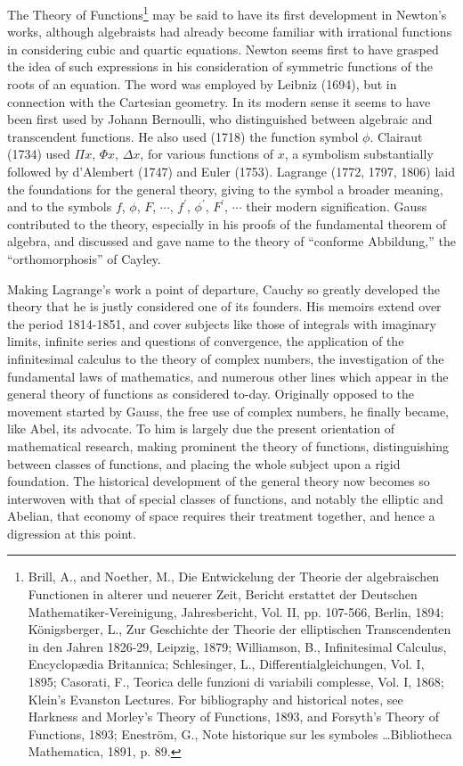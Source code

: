 \documentclass[oneside]{book}
\begin{document}
{The Theory of Functions\footnote{Brill, A., and Noether, M., Die
Entwickelung der Theorie der algebraischen Functionen in alterer
und neuerer Zeit, Bericht erstattet der Deutschen
Mathematiker-Vereinigung, Jahresbericht, Vol. II, pp. 107-566,
Berlin, 1894; K\"onigsberger, L., Zur Geschichte der Theorie der
elliptischen Transcendenten in den Jahren 1826-29, Leipzig, 1879;
Williamson, B., Infinitesimal Calculus, Encyclop\ae{}dia Britannica;
Schlesinger, L., Differentialgleichungen, Vol. I, 1895; Casorati,
F., Teorica delle funzioni di variabili complesse, Vol. I, 1868;
Klein's Evanston Lectures. For bibliography and historical notes,
see Harkness and Morley's Theory of Functions, 1893, and Forsyth's
Theory of Functions, 1893; Enestr\"om, G., Note historique sur les
symboles \ldots Bibliotheca Mathematica, 1891, p. 89.} may be said to
have its first development in Newton's works, although algebraists
had already become familiar with irrational functions in considering
cubic and quartic equations. Newton seems first to have grasped the
idea of such expressions in his consideration of symmetric functions
of the roots of an equation. The word was employed by Leibniz
(1694), but in connection with the Cartesian geometry. In its modern
sense it seems to have been first used by Johann Bernoulli, who
distinguished between algebraic and transcendent functions. He also
used (1718) the function symbol $\phi$. Clairaut (1734) used $\Pi
x$, $\Phi x$, $\Delta x$, for various functions of $x$, a symbolism
substantially followed by d'Alembert (1747) and Euler
(1753). Lagrange (1772, 1797, 1806) laid the foundations for the
general theory, giving to the symbol a broader meaning, and to the
symbols $f$, $\phi$, $F$, $\cdots$, $f^{\prime}$, $\phi^{\prime}$,
$F^{\prime}$, $\cdots$ their modern signification. Gauss contributed
to the theory, especially in his proofs of the fundamental theorem
of algebra, and discussed and gave name to the theory of ``conforme
Abbildung,'' the ``orthomorphosis'' of Cayley.

Making Lagrange's work a point of departure, Cauchy so greatly
developed the theory that he is justly considered one of its
founders. His memoirs extend over the period 1814-1851, and cover
subjects like those of integrals with imaginary limits, infinite
series and questions of convergence, the application of the
infinitesimal calculus to the theory of complex numbers, the
investigation of the fundamental laws of mathematics, and numerous
other lines which appear in the general theory of functions as
considered to-day. Originally opposed to the movement started by
Gauss, the free use of complex numbers, he finally became, like
Abel, its advocate. To him is largely due the present orientation of
mathematical research, making prominent the theory of functions,
distinguishing between classes of functions, and placing the whole
subject upon a rigid foundation. The historical development of the
general theory now becomes so interwoven with that of special
classes of functions, and notably the elliptic and Abelian, that
economy of space requires their treatment together, and hence a
digression at this point.

}
\end{document}

